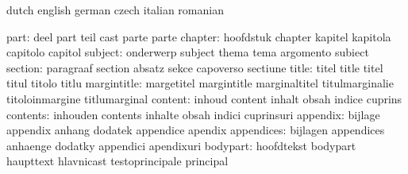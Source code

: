 \stopvariables




\startvariables            dutch                     english
                           german                    czech
                           italian                   romanian

                     part: deel                      part
                           teil                      cast
                           parte                     parte
                  chapter: hoofdstuk                 chapter
                           kapitel                   kapitola
                           capitolo                  capitol
                  subject: onderwerp                 subject
                           thema                     tema
                           argomento                 subiect
                  section: paragraaf                 section
                           absatz                    sekce
                           capoverso                 sectiune
                    title: titel                     title
                           titel                     titul
                           titolo                    titlu
              margintitle: margetitel                margintitle
                           marginaltitel             titulmarginalie
                           titoloinmargine           titlumarginal
                  content: inhoud                    content
                           inhalt                    obsah
                           indice                    cuprins
                 contents: inhouden                  contents
                           inhalte                   obsah
                           indici                    cuprinsuri
                 appendix: bijlage                   appendix
                           anhang                    dodatek
                           appendice                 apendix
               appendices: bijlagen                  appendices
                           anhaenge                  dodatky
                           appendici                 apendixuri
                 bodypart: hoofdtekst                bodypart
                           haupttext                 hlavnicast
                           testoprincipale           principal %
